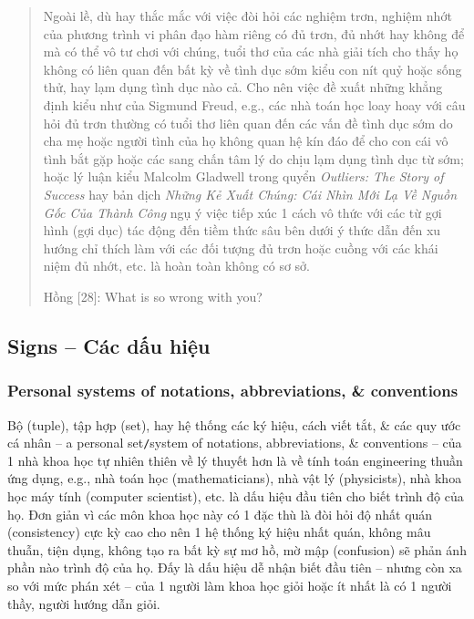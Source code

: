 \documentclass[12pt]{article}
\begin{document}
\begin{quote}
	Ngoài lề, dù hay thắc mắc với việc đòi hỏi các nghiệm trơn, nghiệm nhớt của phương trình vi phân đạo hàm riêng có đủ trơn, đủ nhớt hay không để mà có thể vô tư chơi với chúng, tuổi thơ của các nhà giải tích cho thấy họ không có liên quan đến bất kỳ về tình dục sớm kiểu con nít quỷ hoặc sống thử, hay lạm dụng tình dục nào cả. Cho nên việc đề xuất những khẳng định kiểu như của {\sc Sigmund Freud}, e.g., các nhà toán học loay hoay với câu hỏi đủ trơn thường có tuổi thơ liên quan đến các vấn đề tình dục sớm do cha mẹ hoặc người tình của họ không quan hệ kín đáo để cho con cái vô tình bắt gặp hoặc các sang chấn tâm lý do chịu lạm dụng tình dục từ sớm; hoặc lý luận kiểu {\sc Malcolm Gladwell} trong quyển {\it Outliers: The Story of Success} \cite{Gladwell2008} hay bản dịch {\it Những Kẻ Xuất Chúng: Cái Nhìn Mới Lạ Về Nguồn Gốc Của Thành Công} \cite{Gladwell_outlier} ngụ ý việc tiếp xúc 1 cách vô thức với các từ gợi hình (gợi dục) tác động đến tiềm thức sâu bên dưới ý thức dẫn đến xu hướng chỉ thích làm với các đối tượng đủ trơn hoặc cuồng với các khái niệm đủ nhớt, etc. là hoàn toàn không có sơ sở.
	
	{\sf Hồng [28]}: What is so wrong with you?
\end{quote}

\subsection{Signs -- Các dấu hiệu}

\subsubsection{Personal systems of notations, abbreviations, \& conventions}
Bộ (tuple), tập hợp (set), hay hệ thống các ký hiệu, cách viết tắt, \& các quy ước cá nhân -- a personal set{\tt/}system of notations, abbreviations, \& conventions -- của 1 nhà khoa học tự nhiên thiên về lý thuyết hơn là về tính toán engineering thuần ứng dụng, e.g., nhà toán học (mathematicians), nhà vật lý (physicists), nhà khoa học máy tính (computer scientist), etc. là dấu hiệu đầu tiên cho biết trình độ của họ. Đơn giản vì các môn khoa học này có 1 đặc thù là đòi hỏi độ nhất quán (consistency) cực kỳ cao cho nên 1 hệ thống ký hiệu nhất quán, không mâu thuẫn, tiện dụng, không tạo ra bất kỳ sự mơ hồ, mờ mập (confusion) sẽ phản ánh phần nào trình độ của họ. Đấy là dấu hiệu dễ nhận biết đầu tiên -- nhưng còn xa so với mức phán xét -- của 1 người làm khoa học giỏi hoặc ít nhất là có 1 người thầy, người hướng dẫn giỏi.
\end{document}

